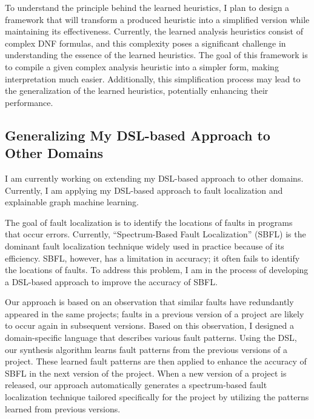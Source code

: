 \documentclass[11pt]{article}
\newcommand{\myparagraph}[1]{\medskip\noindent{\it \textbf{#1.}}}
\begin{document}
To understand the principle behind the learned heuristics, I plan to design a framework that will transform a produced heuristic into a simplified version while maintaining its effectiveness.
%
Currently, the learned analysis heuristics consist of complex DNF formulas, and this complexity poses a significant challenge in understanding the essence of the learned heuristics.
%
The goal of this framework is to compile a given complex analysis heuristic into a simpler form, making interpretation much easier.
%
Additionally, this simplification process may lead to the generalization of the learned heuristics, potentially enhancing their performance.



\subsection{Generalizing My DSL-based Approach to Other Domains}
I am currently working on extending my DSL-based approach to other domains.
%
Currently, I am applying my DSL-based approach to fault localization and explainable graph machine learning.

\myparagraph{DSL-based Approach for Fault Localization}
The goal of fault localization is to identify the locations of faults in programs that occur errors.
%
Currently, ``Spectrum-Based Fault Localization'' (SBFL) is the dominant fault localization technique widely used in practice because of its efficiency.
%
SBFL, however, has a limitation in accuracy; it often fails to identify the locations of faults.
%
To address this problem, I am in the process of developing a DSL-based approach to improve the accuracy of SBFL.


Our approach is based on an observation that similar faults have redundantly appeared in the same projects; faults in a previous version of a project are likely to occur again in subsequent versions.
%
Based on this observation, I designed a domain-specific language that describes various fault patterns.
%
Using the DSL, our synthesis algorithm learns fault patterns from the previous versions of a project.
%
These learned fault patterns are then applied to enhance the accuracy of SBFL in the next version of the project.
%
When a new version of a project is released, our approach automatically generates a spectrum-based fault localization technique tailored specifically for the project by utilizing the patterns learned from previous versions.
\end{document}
